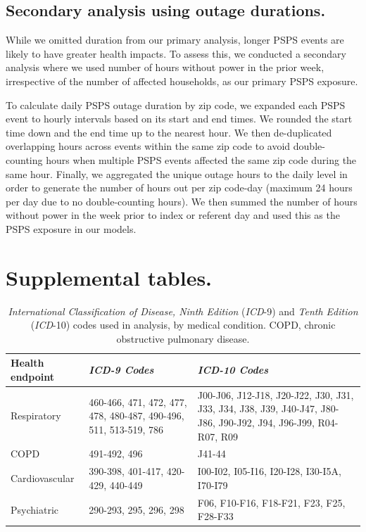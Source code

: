 \documentclass[../main.tex]{subfiles}
\begin{document}
\subsection{Secondary analysis using outage durations.}
While we omitted duration from our primary analysis, longer PSPS events are likely to have greater health impacts. To assess this, we conducted a secondary analysis where we used number of hours without power in the prior week, irrespective of the number of affected households, as our primary PSPS exposure.

To calculate daily PSPS outage duration by zip code, we expanded each PSPS event to hourly intervals based on its start and end times. We rounded the start time down and the end time up to the nearest hour. We then de-duplicated overlapping hours across events within the same zip code to avoid double-counting hours when multiple PSPS events affected the same zip code during the same hour. Finally, we aggregated the unique outage hours to the daily level in order to generate the number of hours out per zip code-day (maximum 24 hours per day due to no double-counting hours). We then summed the number of hours without power in the week prior to index or referent day and used this as the PSPS exposure in our models.


\pagebreak
\section{Supplemental tables.}
\begin{table}[h]
\centering
\begin{tabular}{|p{}|p{}|p{}|}
\hline
\textbf{Health endpoint} & \textbf{\textit{ICD-9 Codes}} & \textbf{\textit{ICD-10 Codes}} \\
\hline
Respiratory & 460-466, 471, 472, 477, 478, 480-487, 490-496, 511, 513-519, 786 & J00-J06, J12-J18, J20-J22, J30, J31, J33, J34, J38, J39, J40-J47, J80-J86, J90-J92, J94, J96-J99, R04-R07, R09 \\
\hline
COPD & 491-492, 496 & J41-44 \\
\hline
Cardiovascular & 390-398, 401-417, 420-429, 440-449 & I00-I02, I05-I16, I20-I28, I30-I5A, I70-I79 \\
\hline
Psychiatric & 290-293, 295, 296, 298 & F06, F10-F16, F18-F21, F23, F25, F28-F33 \\
\hline
\end{tabular}
\caption{\textit{International Classification of Disease, Ninth Edition} (\textit{ICD}-9) and \textit{Tenth Edition} (\textit{ICD}-10) codes used in analysis, by medical condition. COPD, chronic obstructive pulmonary disease.} 
\label{tab:icd_codes}
\end{table}
\end{document}

